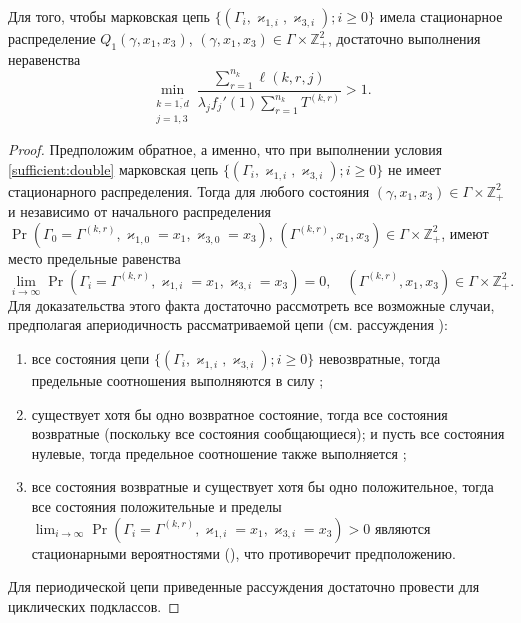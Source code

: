 \documentclass[a4paper,12pt,russian]{extarticle}
\begin{document}
\begin{theorem}
Для того, чтобы марковская цепь $\{(\Gamma_i, \varkappa_{1,i},\varkappa_{3,i}); i \geqslant 0\}$ имела стационарное распределение $Q_1(\gamma,x_1,x_3)$, $(\gamma,x_1,x_3)\in \Gamma \times {\mathbb Z}^2_+$, достаточно выполнения неравенства 
\begin{equation}
\min_{\substack{k=\overline{1,d}\\ j=1,3}} { \frac{\sum_{r = 1}^{n_k} \ell(k,r,j) }{\lambda_j f_j'(1) \sum_{r=1}^{n_k} T^{(k,r)} }}>1.
\label{sufficient:double}
\end{equation}
\end{theorem}
\begin{proof}
Предположим обратное, а именно, что при выполнении условия \eqref{sufficient:double} марковская цепь $\{(\Gamma_i, \varkappa_{1,i},\varkappa_{3,i}); i \geqslant 0\}$ не имеет стационарного распределения. 
Тогда для любого состояния $(\gamma,x_1,x_3)\in \Gamma \times {\mathbb Z}^2_+$ и независимо от начального распределения $\Pr(\Gamma_{0}=\Gamma^{(k,r)}, \varkappa_{1,0}=x_1, \varkappa_{3,0}=x_3)$,
$(\Gamma^{(k,r)},x_1,x_3)\in \Gamma \times {\mathbb Z}^2_+$, 
имеют место предельные равенства 
\begin{equation}
\lim_{i \to \infty} \Pr(\Gamma_{i}=\Gamma^{(k,r)}, \varkappa_{1,i}=x_1, \varkappa_{3,i}=x_3) =0, \quad  (\Gamma^{(k,r)},x_1,x_3)\in \Gamma \times {\mathbb Z}^2_+.
\label{zero:limit:equations:1}
\end{equation} 
Для доказательства этого факта достаточно рассмотреть все возможные случаи, предполагая апериодичность рассматриваемой цепи (см. рассуждения \cite[гл. $3$, \linebreak \S~3-4]{Shiryaev}):
\begin{enumerate}
\item все состояния цепи $\{(\Gamma_i, \varkappa_{1,i},\varkappa_{3,i}); i \geqslant 0\}$ невозвратные, тогда предельные соотношения выполняются в силу \cite[с. 541, лемма $2$]{Shiryaev};
\item существует хотя бы одно возвратное состояние, тогда все состояния возвратные (поскольку все состояния сообщающиеся); и пусть все состояния нулевые, тогда предельное соотношение также выполняется \cite[с. 541, лемма $3$]{Shiryaev};
\item все состояния возвратные и существует хотя бы одно положительное, тогда все состояния положительные и пределы $\lim_{i \to \infty} \Pr(\Gamma_{i}=\Gamma^{(k,r)}, \varkappa_{1,i}=x_1, \varkappa_{3,i}=x_3) > 0$ являются стационарными вероятностями ({\cite[с. 549, теорема $1$]{Shiryaev}}), что противоречит предположению.
\end{enumerate}
Для периодической цепи приведенные рассуждения достаточно провести для циклических подклассов.


\end{proof}
\end{document}
